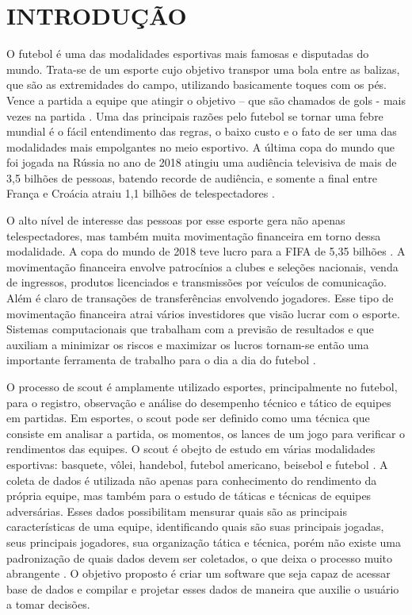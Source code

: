 \newpage
\section{INTRODUÇÃO}
O futebol é uma das modalidades esportivas mais famosas e disputadas do mundo. Trata-se de um esporte cujo objetivo transpor uma bola entre as balizas, que são as extremidades do campo, utilizando basicamente toques com os pés. Vence a partida a equipe que atingir o objetivo – que são chamados de gols - mais vezes na partida \cite{Sfeir2011}. Uma das principais razões pelo futebol se tornar uma febre mundial é o fácil entendimento das regras, o baixo custo e o fato de ser uma das modalidades mais empolgantes no meio esportivo. A última copa do mundo que foi jogada na Rússia no ano de 2018 atingiu uma audiência televisiva de mais de 3,5 bilhões de pessoas, batendo recorde de audiência, e somente a final entre França e Croácia atraiu 1,1 bilhões de telespectadores \cite{Chade2018}.

O alto nível de interesse das pessoas por esse esporte gera não apenas telespectadores, mas também muita movimentação financeira em torno dessa modalidade. A copa do mundo de 2018 teve lucro para a FIFA de 5,35 bilhões \cite{FIFA2018}. A movimentação financeira envolve patrocínios a clubes e seleções nacionais, venda de ingressos, produtos licenciados e transmissões por veículos de comunicação. Além é claro de transações de transferências envolvendo jogadores. Esse tipo de movimentação financeira atrai vários investidores que visão lucrar com o esporte. Sistemas computacionais que trabalham com a previsão de resultados e que auxiliam a minimizar os riscos e maximizar os lucros tornam-se então uma importante ferramenta de trabalho para o dia a dia do futebol \cite{Perin2013}.

O processo de scout é amplamente utilizado esportes, principalmente no futebol, para o registro, observação e análise do desempenho técnico e tático de equipes em partidas. Em esportes, o scout pode ser definido como uma técnica que consiste em analisar a partida, os momentos, os lances de um jogo para verificar o rendimentos das equipes. O scout é obejto de estudo em várias modalidades esportivas: basquete, vôlei, handebol, futebol americano, beisebol e futebol \cite{Martins2017}. A coleta de dados é utilizada não apenas para conhecimento do rendimento da própria equipe, mas também para o estudo de táticas e técnicas de equipes adversárias. Esses dados possibilitam mensurar quais são as principais características de uma equipe, identificando quais são suas principais jogadas, seus principais jogadores, sua organização tática e técnica, porém não existe uma padronização de quais dados devem ser coletados, o que deixa o processo muito abrangente \cite{Duarte2015}. O objetivo proposto é criar um software que seja capaz de acessar base de dados e compilar e projetar esses dados de maneira que auxilie o usuário a tomar decisões.

